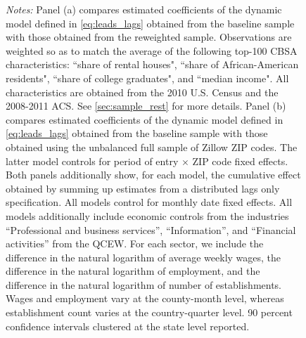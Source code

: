 \begin{figure}[htb!]
\begin{minipage}{0.95\textwidth}
		\textit{Notes:} Panel (a) compares estimated coefficients of the dynamic model defined in 
		\autoref{eq:leads_lags} obtained from the baseline sample with those obtained from the 
		reweighted sample. Observations are weighted so as to match the average of the following 
		top-100 CBSA characteristics: ``share of rental houses", ``share of African-American 
		residents", ``share of college graduates", and ``median income". All characteristics are 
		obtained from the 2010 U.S. Census and the 2008-2011 ACS. See \autoref{sec:sample_rest} for 
		more details. Panel (b) compares estimated coefficients of the dynamic model defined in 
		\autoref{eq:leads_lags} obtained from the baseline sample with those obtained using the 
		unbalanced full sample of Zillow ZIP codes. The latter model controls for period of entry 
		$\times$ ZIP code fixed effects. Both panels additionally show, for each model, the 
		cumulative effect obtained by summing up estimates from a distributed lags only specification. 
		All models control for monthly date fixed effects. All models additionally include economic 
		controls from the industries ``Professional and business services'', ``Information'', and 
		``Financial activities'' from the QCEW. For each sector, we include the difference in the 
		natural logarithm of average weekly wages, the difference in the natural logarithm of 
		employment, and the difference in the natural logarithm of number of establishments. Wages 
		and employment vary at the county-month level, whereas establishment count varies at the 
		country-quarter level.
		90 percent confidence intervals clustered at the state level reported. 
	\end{minipage}
\end{figure}



